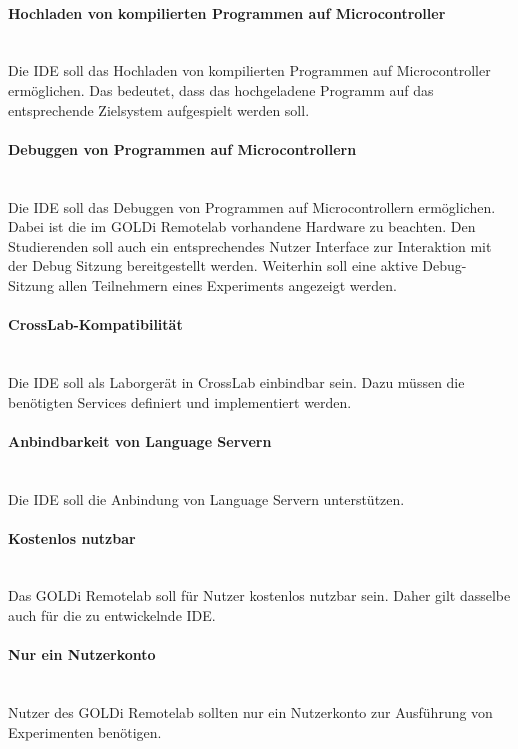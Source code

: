 \paragraph{Hochladen von kompilierten Programmen auf Microcontroller} \mbox{} \\
Die IDE soll das Hochladen von kompilierten Programmen auf Microcontroller ermöglichen. Das bedeutet, dass das hochgeladene Programm auf das entsprechende Zielsystem aufgespielt werden soll.

\paragraph{Debuggen von Programmen auf Microcontrollern} \mbox{} \\
Die IDE soll das Debuggen von Programmen auf Microcontrollern ermöglichen. Dabei ist die im GOLDi Remotelab vorhandene Hardware zu beachten. Den Studierenden soll auch ein entsprechendes Nutzer Interface zur Interaktion mit der Debug Sitzung bereitgestellt werden. Weiterhin soll eine aktive Debug-Sitzung allen Teilnehmern eines Experiments angezeigt werden.

\paragraph{CrossLab-Kompatibilität} \mbox{} \\
Die IDE soll als Laborgerät in CrossLab einbindbar sein. Dazu müssen die benötigten Services definiert und implementiert werden.

\paragraph{Anbindbarkeit von Language Servern} \mbox{} \\
Die IDE soll die Anbindung von Language Servern unterstützen.

\paragraph{Kostenlos nutzbar} \mbox{} \\
Das GOLDi Remotelab soll für Nutzer kostenlos nutzbar sein. Daher gilt dasselbe auch für die zu entwickelnde IDE.

\paragraph{Nur ein Nutzerkonto} \mbox{} \\
Nutzer des GOLDi Remotelab sollten nur ein Nutzerkonto zur Ausführung von Experimenten benötigen.

